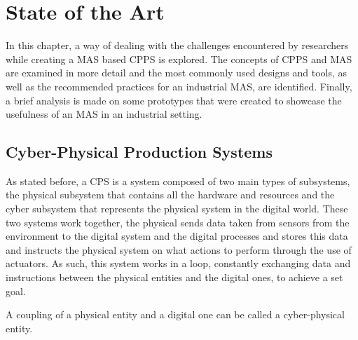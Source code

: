 


\glsresetall

\chapter{State of the Art}
\label{cha:state-of-the-art}

In this chapter, a way of dealing with the challenges encountered by researchers while creating a \acrlong{MAS} based \acrlong{CPPS} is explored. The concepts of \acrshort{CPPS} and \acrshort{MAS} are examined in more detail and the most commonly used designs and tools, as well as the recommended practices for an industrial \acrshort{MAS}, are identified. Finally, a brief analysis is made on some prototypes that were created to showcase the usefulness of an \acrshort{MAS} in an industrial setting.

\section{Cyber-Physical Production Systems}
\label{sec:cyber-physical_production_systems}

As stated before, a \acrlong{CPS} is a system composed of two main types of subsystems, the physical subsystem that contains all the hardware and resources and the cyber subsystem that represents the physical system in the digital world. These two systems work together, the physical sends data taken from sensors from the environment to the digital system and the digital processes and stores this data and instructs the physical system on what actions to perform through the use of actuators. As such, this system works in a loop, constantly exchanging data and instructions between the physical entities and the digital ones, to achieve a set goal. 

A coupling of a physical entity and a digital one can be called a cyber-physical entity.\\

